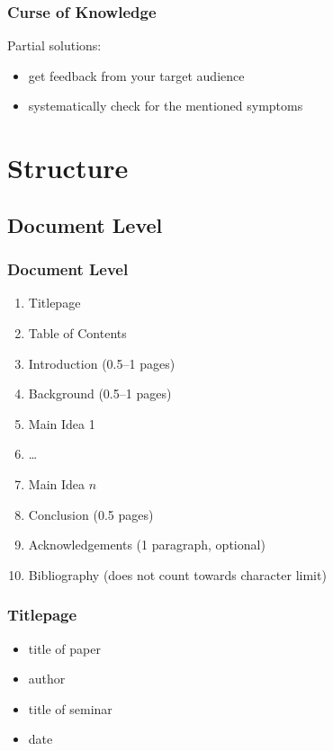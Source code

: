 \begin{frame}
  \frametitle{Curse of Knowledge}

  Partial solutions:
  \begin{itemize}[<+->]
    \item get feedback from your target audience
    \item systematically check for the mentioned symptoms
  \end{itemize}
\end{frame}

\section{Structure}

\subsection{Document Level}

\begin{frame}
  \frametitle{Document Level}

  \begin{enumerate}
    \item Titlepage
    \item Table of Contents
    \item Introduction (0.5--1 pages)
    \item Background (0.5--1 pages)
    \item Main Idea 1
    \item \dots
    \item Main Idea $n$
    \item Conclusion (0.5 pages)
    \item Acknowledgements (1 paragraph, optional)
    \item Bibliography (does not count towards character limit)
  \end{enumerate}
\end{frame}

\begin{frame}
  \frametitle{Titlepage}

  \begin{itemize}
    \item title of paper
    \item author
    \item title of seminar
    \item date
  \end{itemize}
\end{frame}

